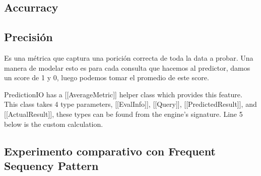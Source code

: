 \subsection{Accurracy}



\subsection{Precisión}


	Es una métrica que captura una porición correcta de toda la data a probar. 
	Una manera de modelar esto es para cada consulta que hacemos al predictor, damos un score de 1 y 0, luego podemos tomar el promedio de este score.
	
	
	
	PredictionIO has a [[AverageMetric]] helper class which provides this feature. This class takes 4 type parameters, [[EvalInfo]], [[Query]], [[PredictedResult]], and [[ActualResult]], these types can be found from the engine's signature. Line 5 below is the custom calculation.
	
	 
	 
	 
	 \subsection{Experimento comparativo con Frequent Sequency Pattern}
	 
